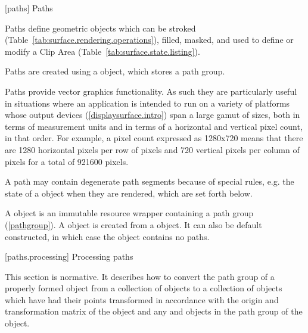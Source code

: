 
 [paths] {Paths}

\pnum
Paths define geometric objects which can be stroked (Table~\ref{tab:surface.rendering.operations}), filled, masked, and used to define or modify a Clip Area (Table~\ref{tab:surface.state.listing}).

\pnum
Paths are created using a  object, which stores a path group. 

\pnum
Paths provide vector graphics functionality. As such they are particularly useful in situations where an application is intended to run on a variety of platforms whose output devices (\ref{displaysurface.intro}) span a large gamut of sizes, both in terms of measurement units and in terms of a horizontal and vertical pixel count, in that order. For example, a pixel count expressed as 1280x720 means that there are 1280 horizontal pixels per row of pixels and 720 vertical pixels per column of pixels for a total of 921600 pixels.
%

\pnum
A path may contain degenerate path segments because of special rules, e.g. the  state of a  object when they are rendered, which are set forth below.

\pnum
A  object is an immutable resource wrapper containing a path group (\ref{pathgroup}). A  object is created from a  object. It can also be default constructed, in which case the  object contains no paths.

 [paths.processing] {Processing paths}

\pnum
This section is normative. It describes how to convert the path group of a properly formed  object from a collection of  objects to a collection of  objects which have had their points transformed in accordance with the origin and transformation matrix of the  object and any  and  objects in the path group of the  object.

